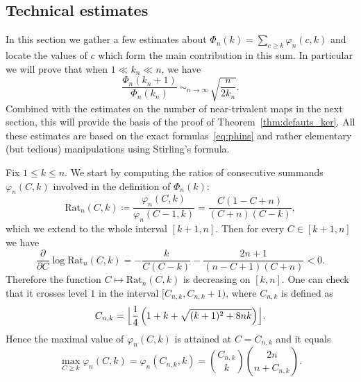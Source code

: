 \documentclass[11pt]{article}
\theoremstyle{plain}
\theoremstyle{definition}
\theoremstyle{remark}
\newcommand{\equi}[1][n]{\,\mathop{\sim}^{}_{#1 \to \infty}\,}
\begin{document}
\subsection{Technical estimates}

In this section we gather a few estimates about $\Phi_n(k) = \sum_{c \geq k} \varphi_{n}(c,k)$ and locate the values of $c$ which form the main contribution in this sum. In particular we will prove that when $1 \ll k_{n} \ll n$, we have
\begin{equation}\label{eq:ratioPhi1}
\frac{ \Phi_{n}(k_{n}+1)}{ \Phi_{n}(k_{n})} \equi \sqrt{ \frac{n}{2 k_{n}}}.
\end{equation}
Combined with the estimates on the number of near-trivalent maps in the next section, this will provide the basis of the proof of Theorem~\ref{thm:defauts_ker}. All these estimates are based on the exact formulas~\eqref{eq:phins} and rather elementary (but tedious) manipulations using Stirling's formula.

Fix $1 \leq k \leq n$. We start by computing the ratios of consecutive summands $\varphi_n(C,k)$ involved in the definition of $\Phi_n(k)$:
\begin{equation}\label{eq:def_Rat}
\mathrm{Rat}_{n}(C,k) \coloneqq \frac{\varphi_n(C,k)}{\varphi_n(C-1,k)} = \frac{C (1 - C + n)}{(C + n) (C - k)},
\end{equation}which we extend to the whole interval $[k+1,n]$.
Then for every $C \in [k+1,n]$ we have
\begin{equation}\label{eq:derivlog}
\frac{\partial}{\partial C} \log \mathrm{Rat}_n(C,k)
= - \frac{k}{C(C-k)}- \frac{2n+1}{(n-C+1)(C+n)}
< 0.
\end{equation}
Therefore the function $C \mapsto \mathrm{Rat}_n(C,k)$ is decreasing on $[k,n]$. One can check that it crosses level $1$ in the interval $[C_{n,k},C_{n,k}+1)$, where $C_{n,k}$ is defined as
\begin{equation}\label{eq:argmax_phi}
C_{n,k} = \Bigl\lfloor \frac{1}{4} \left(1+k + \sqrt{ (k+1)^{2} + 8 n k } \right) \Bigr\rfloor.
\end{equation}
Hence the maximal value of $\varphi_n(C,k)$ is attained at $C=C_{n,k}$ and it equals
\[
\max_{C \ge k} \varphi_n(C,k) = \varphi_n(C_{n,k},k) = \binom{C_{n,k}}{k} \binom{2n}{n+C_{n,k}}.
\]
\end{document}
